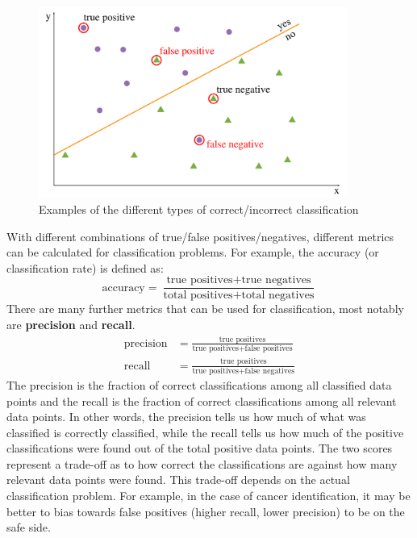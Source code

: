 \documentclass[CS5104-Notes.tex]{subfiles}
\begin{document}
\begin{figure}[H]
\centering
\includegraphics[width=0.9\textwidth, keepaspectratio]{imgs/classification-metrics.png}
\caption{Examples of the different types of correct/incorrect classification}
\end{figure}
\noindent
With different combinations of true/false positives/negatives, different metrics can be calculated for classification problems. For example, the accuracy (or classification rate) is defined as:
\begin{equation}
\text{accuracy} = \frac{\text{true positives} + \text{true negatives}}{\text{total positives} + \text{total negatives}}
\end{equation}
There are many further metrics that can be used for classification, most notably are \textbf{precision} and \textbf{recall}.
\begin{align}
\text{precision} &= \frac{\text{true positives}}{\text{true positives} + \text{false positives}} \\
\text{recall} &= \frac{\text{true positives}}{\text{true positives} + \text{false negatives}}
\end{align}
The precision is the fraction of correct classifications among all classified data points and the recall is the fraction of correct classifications among all relevant data points. In other words, the precision tells us how much of what was classified is correctly classified, while the recall tells us how much of the positive classifications were found out of the total positive data points. The two scores represent a trade-off as to how correct the classifications are against how many relevant data points were found. This trade-off depends on the actual classification problem. For example, in the case of cancer identification, it may be better to bias towards false positives (higher recall, lower precision) to be on the safe side.
\end{document}
